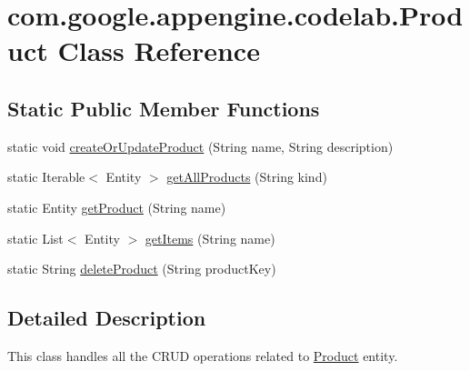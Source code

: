 \hypertarget{classcom_1_1google_1_1appengine_1_1codelab_1_1_product}{\section{com.\-google.\-appengine.\-codelab.\-Product Class Reference}
\label{classcom_1_1google_1_1appengine_1_1codelab_1_1_product}
}
\subsection*{Static Public Member Functions}
\begin{DoxyCompactItemize}
\item 
static void \hyperlink{classcom_1_1google_1_1appengine_1_1codelab_1_1_product_a0ad4aec15554c898684fcd6ea8d9ef10}{create\-Or\-Update\-Product} (String name, String description)
\item 
static Iterable$<$ Entity $>$ \hyperlink{classcom_1_1google_1_1appengine_1_1codelab_1_1_product_a4fb28dec3d7ae43c47581ecadb62012b}{get\-All\-Products} (String kind)
\item 
static Entity \hyperlink{classcom_1_1google_1_1appengine_1_1codelab_1_1_product_a8281f8c29702347f39fcb651db5e073f}{get\-Product} (String name)
\item 
static List$<$ Entity $>$ \hyperlink{classcom_1_1google_1_1appengine_1_1codelab_1_1_product_a7a8a391c4b6446d33e163ceb21521e69}{get\-Items} (String name)
\item 
static String \hyperlink{classcom_1_1google_1_1appengine_1_1codelab_1_1_product_addc5d2e4ec78d1eef631ffc4cdf268a1}{delete\-Product} (String product\-Key)
\end{DoxyCompactItemize}


\subsection{Detailed Description}
This class handles all the C\-R\-U\-D operations related to \hyperlink{classcom_1_1google_1_1appengine_1_1codelab_1_1_product}{Product} entity. 

